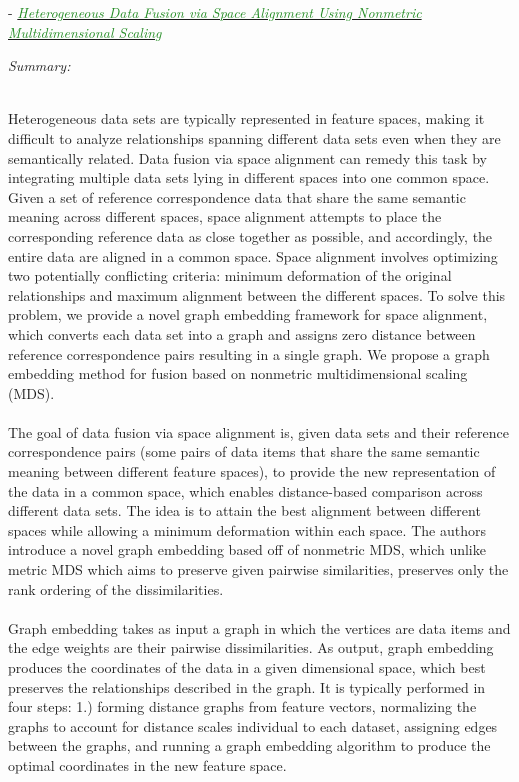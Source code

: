 \documentclass[]{article}
\newcommand{\paperentry}[4]{
            \hangindent=1cm
            \cite{#1} - \href{run:../References/#3}{\textcolor{ForestGreen}{\textit{#2}}}
            
            \noindent            
            \begin{minipage}[t]{0.1\linewidth}\hfill\end{minipage}
            \begin{minipage}[t]{0.8\linewidth}\textcolor{NavyBlue}{{\textit{Summary:}}}#4\end{minipage}
            \vspace{.25cm}
          }
\begin{document}
		\paperentry{Choo2012HeterogeneousDataFusionGraphs}
		{Heterogeneous Data Fusion via Space Alignment Using Nonmetric Multidimensional Scaling}
		{Manifold_Representation_Learning/Alignment/Choo2012HeterogeneousDataFusionGraphs.pdf}
		{}\\
		Heterogeneous data sets are typically represented in feature spaces, making it difficult to analyze relationships spanning different data sets even when they are semantically related. Data fusion via space alignment can remedy this task by integrating multiple data sets lying in different spaces into one common space. Given a set of reference correspondence data that share the same semantic meaning across different spaces, space alignment attempts to place the corresponding reference data as close together as possible, and accordingly, the entire data are aligned in a common space. Space alignment involves optimizing two	potentially conflicting criteria: minimum deformation of the
		original relationships and maximum alignment between the different spaces. To solve this problem, we provide a novel	graph embedding framework for space alignment, which converts each data set into a graph and assigns zero distance between reference correspondence pairs resulting in a single graph. We propose a graph embedding method for fusion based on nonmetric multidimensional scaling (MDS). 
		\\ \\
		The goal of data fusion via space alignment is, given data sets and their reference correspondence pairs (some pairs of data items that share the same semantic meaning between different feature spaces), to provide the new representation of the data in a common space, which enables distance-based comparison across different data sets.   The idea is to attain the best alignment between different spaces while allowing a minimum deformation within each space.  The authors introduce a novel graph embedding based off of nonmetric MDS, which unlike metric MDS which aims to preserve given pairwise similarities, preserves only the rank ordering of the dissimilarities.
		\\ \\
		Graph embedding takes as input a graph in which the vertices are data items and the edge weights are their pairwise dissimilarities.  As output, graph embedding produces the coordinates of the data in a given dimensional space, which best preserves the relationships described in the graph.  It is typically performed in four steps: 1.) forming distance graphs from feature vectors, normalizing the graphs to account for distance scales individual to each dataset, assigning edges between the graphs, and running a graph embedding algorithm to produce the optimal coordinates in the new feature space.
\end{document}
